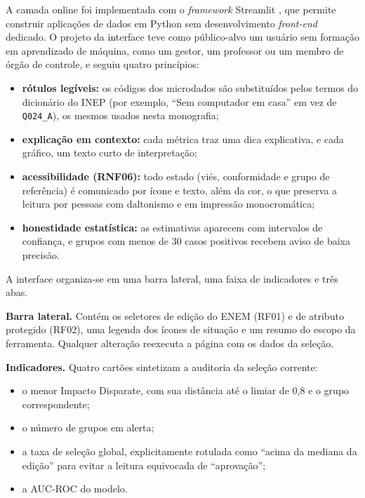 A camada online foi implementada com o \textit{framework} Streamlit \cite{streamlit2026}, que permite construir aplicações de dados em Python sem desenvolvimento \textit{front-end} dedicado. O projeto da interface teve como público-alvo um usuário sem formação em aprendizado de máquina, como um gestor, um professor ou um membro de órgão de controle, e seguiu quatro princípios:
\begin{itemize}
    \item \textbf{rótulos legíveis:} os códigos dos microdados são substituídos pelos termos do dicionário do INEP (por exemplo, ``Sem computador em casa'' em vez de \texttt{Q024\_A}), os mesmos usados nesta monografia;
    \item \textbf{explicação em contexto:} cada métrica traz uma dica explicativa, e cada gráfico, um texto curto de interpretação;
    \item \textbf{acessibilidade (RNF06):} todo estado (viés, conformidade e grupo de referência) é comunicado por ícone e texto, além da cor, o que preserva a leitura por pessoas com daltonismo e em impressão monocromática;
    \item \textbf{honestidade estatística:} as estimativas aparecem com intervalos de confiança, e grupos com menos de 30 casos positivos recebem aviso de baixa precisão.
\end{itemize}
A interface organiza-se em uma barra lateral, uma faixa de indicadores e três abas.

\textbf{Barra lateral.} Contém os seletores de edição do ENEM (RF01) e de atributo protegido (RF02), uma legenda dos ícones de situação e um resumo do escopo da ferramenta. Qualquer alteração reexecuta a página com os dados da seleção.

\textbf{Indicadores.} Quatro cartões sintetizam a auditoria da seleção corrente:
\begin{itemize}
    \item o menor Impacto Disparate, com sua distância até o limiar de 0,8 e o grupo correspondente;
    \item o número de grupos em alerta;
    \item a taxa de seleção global, explicitamente rotulada como ``acima da mediana da edição'' para evitar a leitura equivocada de ``aprovação'';
    \item a AUC-ROC do modelo.
\end{itemize}


